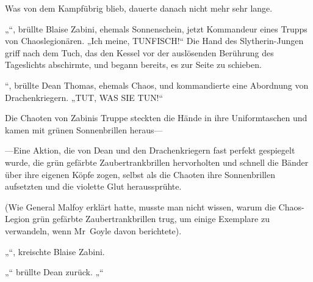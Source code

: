 Was von dem Kampfübrig blieb, dauerte danach nicht mehr sehr lange.

\later

„“, brüllte Blaise Zabini, ehemals Sonnenschein, jetzt Kommandeur eines Trupps von Chaoslegionären. „Ich meine, TUNFISCH!“ Die Hand des Slytherin-Jungen griff nach dem Tuch, das den Kessel vor der auslösenden Berührung des Tageslichts abschirmte, und begann bereits, es zur Seite zu schieben.

“, brüllte Dean Thomas, ehemals Chaos, und kommandierte eine Abordnung von Drachenkriegern. „TUT, WAS SIE TUN!“

Die Chaoten von Zabinis Truppe steckten die Hände in ihre Uniformtaschen und kamen mit grünen Sonnenbrillen heraus—

—Eine Aktion, die von Dean und den Drachenkriegern fast perfekt gespiegelt wurde, die grün gefärbte Zaubertrankbrillen hervorholten und schnell die Bänder über ihre eigenen Köpfe zogen, selbst als die Chaoten ihre Sonnenbrillen aufsetzten und die violette Glut heraussprühte.

(Wie General Malfoy erklärt hatte, musste man nicht wissen, warum die Chaos-Legion grün gefärbte Zaubertrankbrillen trug, um einige Exemplare zu verwandeln, wenn Mr~Goyle davon berichtete).

„“, kreischte Blaise Zabini.

„“ brüllte Dean zurück. „“

